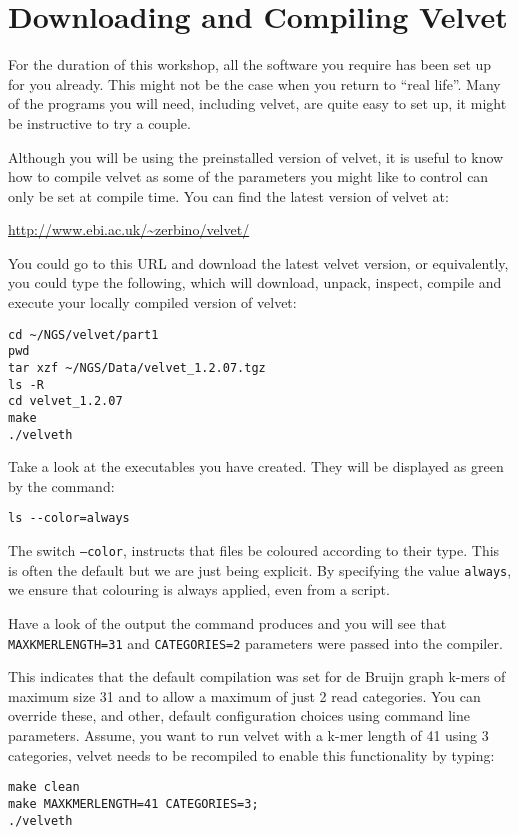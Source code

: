 \section{Downloading and Compiling Velvet}
\begin{note}
For the duration of this workshop, all the software you require has been set up
for you already. This might not be the case when you return to ``real life''. Many
of the programs you will need, including velvet, are quite easy to set up, it
might be instructive to try a couple.
\end{note}

\begin{information}
Although you will be using the preinstalled version of velvet, it is useful to
know how to compile velvet as some of the parameters you might like to control
can only be set at compile time. You can find the latest version of velvet at:

{\centering
\url{http://www.ebi.ac.uk/~zerbino/velvet/}
 
}

You could go to this URL and download the latest velvet version, or
equivalently, you could type the following, which will download, unpack,
inspect, compile and execute your locally compiled version of velvet:
\begin{lstlisting}
cd ~/NGS/velvet/part1
pwd
tar xzf ~/NGS/Data/velvet_1.2.07.tgz
ls -R
cd velvet_1.2.07
make
./velveth
\end{lstlisting}
\end{information}

\begin{steps}
Take a look at the executables you have created. They will be displayed as green
by the command:
\begin{lstlisting}
ls --color=always
\end{lstlisting}
\end{steps}

\begin{note}
The switch \texttt{--color}, instructs that files be coloured according to their
type. This is often the default but we are just being explicit. By specifying
the value \texttt{always}, we ensure that colouring is always applied, even from
a script.
\end{note}

\begin{steps}
Have a look of the output the command produces and you will see that
\texttt{MAXKMERLENGTH=31} and \texttt{CATEGORIES=2} parameters were passed into
the compiler.

This indicates that the default compilation was set for de Bruijn graph k-mers of
maximum size 31 and to allow a maximum of just 2 read categories. You can
override these, and other, default configuration choices using command line
parameters. Assume, you want to run velvet with a k-mer length of 41 using 3
categories, velvet needs to be recompiled to enable this functionality by
typing:
\begin{lstlisting}
make clean
make MAXKMERLENGTH=41 CATEGORIES=3;
./velveth
\end{lstlisting}
\end{steps}

